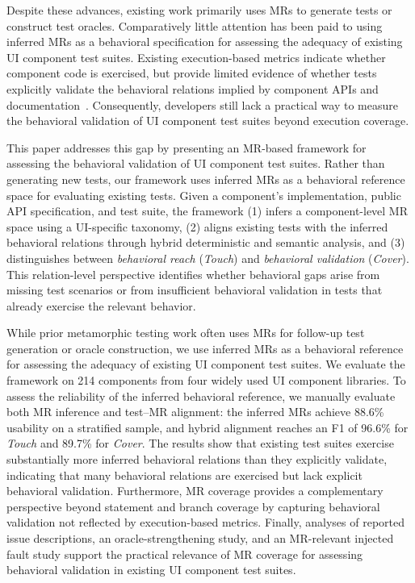 Despite these advances, existing work primarily uses MRs to generate tests or construct test oracles. Comparatively little attention has been paid to using inferred MRs as a behavioral specification for assessing the adequacy of existing UI component test suites. Existing execution-based metrics indicate whether component code is exercised, but provide limited evidence of whether tests explicitly validate the behavioral relations implied by component APIs and documentation~\cite{huo2014improving, goldstein2024property}. Consequently, developers still lack a practical way to measure the behavioral validation of UI component test suites beyond execution coverage.

This paper addresses this gap by presenting an MR-based framework for assessing the behavioral validation of UI component test suites. Rather than generating new tests, our framework uses inferred MRs as a behavioral reference space for evaluating existing tests. Given a component's implementation, public API specification, and test suite, the framework (1) infers a component-level MR space using a UI-specific taxonomy, (2) aligns existing tests with the inferred behavioral relations through hybrid deterministic and semantic analysis, and (3) distinguishes between \textit{behavioral reach} (\textit{Touch}) and \textit{behavioral validation} (\textit{Cover}). This relation-level perspective identifies whether behavioral gaps arise from missing test scenarios or from insufficient behavioral validation in tests that already exercise the relevant behavior.

While prior metamorphic testing work often uses MRs for follow-up test generation or oracle construction, we use inferred MRs as a behavioral reference for assessing the adequacy of existing UI component test suites.
We evaluate the framework on 214 components from four widely used UI component libraries. To assess the reliability of the inferred behavioral reference, we manually evaluate both MR inference and test--MR alignment: the inferred MRs achieve 88.6\% usability on a stratified sample, and hybrid alignment reaches an F1 of 96.6\% for \textit{Touch} and 89.7\% for \textit{Cover}. The results show that existing test suites exercise substantially more inferred behavioral relations than they explicitly validate, indicating that many behavioral relations are exercised but lack explicit behavioral validation. Furthermore, MR coverage provides a complementary perspective beyond statement and branch coverage by capturing behavioral validation not reflected by execution-based metrics. Finally, analyses of reported issue descriptions, an oracle-strengthening study, and an MR-relevant injected fault study support the practical relevance of MR coverage for assessing behavioral validation in existing UI component test suites. 


